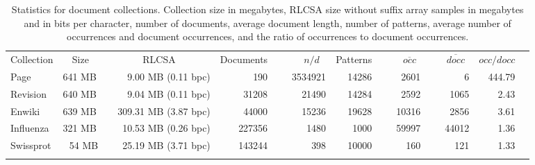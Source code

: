 \documentclass[11pt]{llncs}
\newcommand{\avg}[1]{\ensuremath{\overline{ #1 }}}
\newcommand{\Enwiki}{\textsf{Enwiki}}
\newcommand{\Page}{\textsf{Page}}
\newcommand{\Revision}{\textsf{Revision}}
\newcommand{\Influenza}{\textsf{Influenza}}
\newcommand{\Swissprot}{\textsf{Swissprot}}
\begin{document}
\begin{table}[t]
\centering
\caption{Statistics for document collections. Collection size in megabytes, RLCSA size without suffix array samples in megabytes and in bits per character, number of documents, average document length, number of patterns, average number of occurrences and document occurrences, and the ratio of occurrences to document occurrences.}\label{table:collections}

\begin{tabular}{llrrrrrrrr}
\hline
\noalign{\smallskip}
Collection & \multicolumn{1}{c}{Size} & \multicolumn{1}{c}{RLCSA} & Documents & $n/d~~~$ & Patterns & $\avg{occ}~~$ & $\avg{docc}~~$ & $occ/docc$ \\
\noalign{\smallskip}
\hline
\noalign{\smallskip}
\Page      & 641 MB &   9.00 MB (0.11 bpc) &    190 & ~~~3534921 & 14286 &  2601 &     6 & 444.79 \\
\Revision  & 640 MB &   9.04 MB (0.11 bpc) &  31208 &   21490 & 14284 &  2592 &  1065 &   2.43 \\
\Enwiki    & 639 MB & ~~309.31 MB (3.87 bpc) &  44000 &   15236 & 19628 & 10316 &  2856 &   3.61 \\
\Influenza & 321 MB &  10.53 MB (0.26 bpc) & 227356 &    1480 &  1000 & ~~~59997 & ~~~44012 &   1.36 \\
\Swissprot & ~\,54 MB &  25.19 MB (3.71 bpc) & 143244 &     398 & 10000 &   160 &   121 &   1.33 \\
\noalign{\smallskip}
\hline
\end{tabular}
\end{table}
\end{document}
